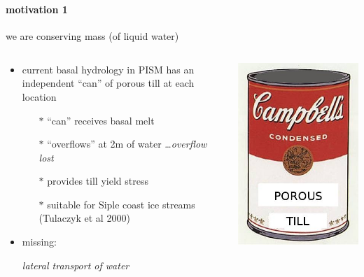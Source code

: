 \documentclass[hide notes,intlimits]{beamer}
\begin{document}
\begin{frame}
  \frametitle{\whytitle}
  \framesubtitle{motivation 1}

\vspace{-6mm}
\begin{center}
  we are  conserving mass (of liquid water)
\end{center}

\vspace{-5mm}
\begin{columns}
\begin{column}{0.5\textwidth}
  \begin{itemize}
    \item current basal hydrology in PISM has an independent ``can'' of porous till at each location
      \begin{itemize}
        \item[$\ast$] ``can'' receives basal melt
        \item[$\ast$] ``overflows'' at 2m of water \dots \emph{overflow lost}
        \item[$\ast$] provides till yield stress
        \item[$\ast$] suitable for Siple coast ice streams (Tulaczyk et al 2000)      \end{itemize}
    \item missing:
    
      \begin{center} \emph{lateral transport of water} \end{center}
  \end{itemize}
\end{column}
\begin{column}{0.5\textwidth}
\begin{center}
\includegraphics[height=0.3\textheight]{till-warhol-soup}


\end{center}
\end{column}
\end{columns}
\end{frame}
\end{document}
